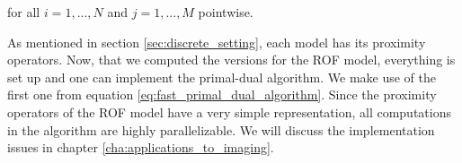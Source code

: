         for all $i = 1, ..., N$ and $j = 1, ..., M$ pointwise.

        As mentioned in section \ref{sec:discrete_setting}, each model has its proximity operators. Now, that we computed the versions for the ROF model, everything is set up and one can implement the primal-dual algorithm. We make use of the first one from equation \ref{eq:fast_primal_dual_algorithm}. Since the proximity operators of the ROF model have a very simple representation, all computations in the algorithm are highly parallelizable. We will discuss the implementation issues in chapter \ref{cha:applications_to_imaging}.


